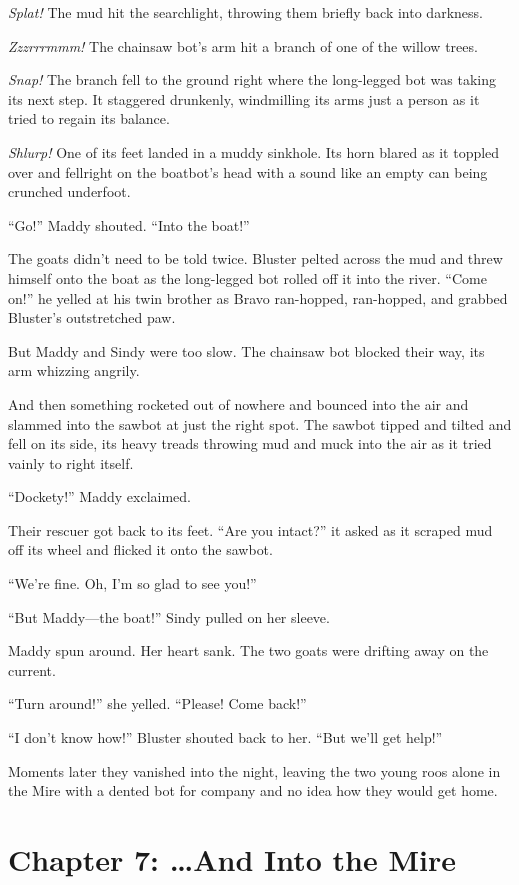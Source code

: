 \documentclass[10pt]{article}
\begin{document}
\emph{Splat!} The mud hit the searchlight, throwing them briefly back
into darkness.

\emph{Zzzrrrmmm!} The chainsaw bot's arm hit a branch of one of the
willow trees.

\emph{Snap!} The branch fell to the ground right where the long-legged
bot was taking its next step. It staggered drunkenly, windmilling its
arms just a person as it tried to regain its balance.

\emph{Shlurp!} One of its feet landed in a muddy sinkhole. Its horn
blared as it toppled over and fellright on the boatbot's head with a
sound like an empty can being crunched underfoot.

``Go!'' Maddy shouted. ``Into the boat!''

The goats didn't need to be told twice. Bluster pelted across the mud
and threw himself onto the boat as the long-legged bot rolled off it
into the river. ``Come on!'' he yelled at his twin brother as Bravo
ran-hopped, ran-hopped, and grabbed Bluster's outstretched paw.

But Maddy and Sindy were too slow. The chainsaw bot blocked their way,
its arm whizzing angrily.

And then something rocketed out of nowhere and bounced into the air and
slammed into the sawbot at just the right spot. The sawbot tipped and
tilted and fell on its side, its heavy treads throwing mud and muck into
the air as it tried vainly to right itself.

``Dockety!'' Maddy exclaimed.

Their rescuer got back to its feet. ``Are you intact?'' it asked as it
scraped mud off its wheel and flicked it onto the sawbot.

``We're fine. Oh, I'm so glad to see you!''

``But Maddy---the boat!'' Sindy pulled on her sleeve.

Maddy spun around. Her heart sank. The two goats were drifting away on
the current.

``Turn around!'' she yelled. ``Please! Come back!''

``I don't know how!'' Bluster shouted back to her. ``But we'll get
help!''

Moments later they vanished into the night, leaving the two young roos
alone in the Mire with a dented bot for company and no idea how they
would get home.

\newpage
\section{Chapter 7: \ldots{}And Into the Mire}
\end{document}
